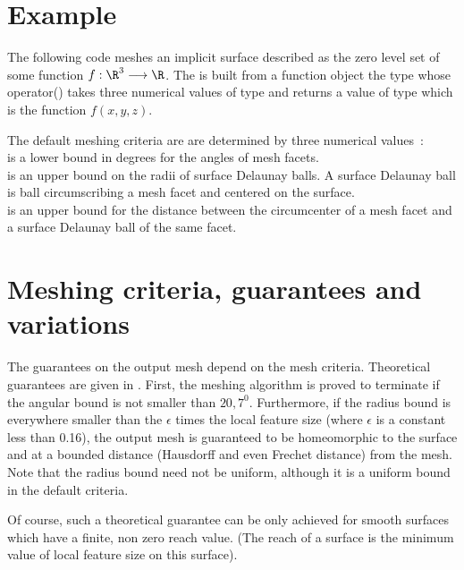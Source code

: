 \section{Example}
\label{SurfaceMesher_section_example}

The following code meshes an implicit surface described as the zero level
set of some function $f : \R^3 \longrightarrow \R$.
The   is built from 
a function object
the type  whose operator()
takes three numerical values  of type 
and returns a value of type  which is the function $f(x,y,z)$.

The default meshing criteria are  are determined  by three numerical
values~: \\ 
 is a lower bound in degrees for the angles 
     of mesh facets.\\
 is an upper bound on the radii of surface Delaunay
balls. A surface Delaunay ball is ball circumscribing a mesh facet
and centered on the surface. \\
 is an upper bound for the distance 
between the circumcenter of a mesh facet and a surface
Delaunay ball of the same facet.


\section{Meshing criteria, guarantees and variations}
\label{SurfaceMesher_section_criteria}
\label{SurfaceMesher_section_variations}

The guarantees on the output mesh depend on the mesh criteria.
Theoretical guarantees are given in \cite{Oudot-and-co}.
First, the meshing algorithm is proved to terminate 
if the angular bound is
not smaller than $20,7^0$. 
Furthermore, if the radius bound is everywhere smaller than 
the $\epsilon$ times the local feature size  (where $\epsilon$ is a constant
less than 0.16),  the output mesh 
is guaranteed to be homeomorphic to the surface
and at a bounded distance (Hausdorff and even Frechet distance)
from the mesh.
Note that the radius bound need not be uniform,
although it is a uniform bound in the default criteria.

Of course, such a theoretical guarantee can be only achieved
for smooth surfaces which have a finite, non zero
reach value. (The reach of a surface is the minimum value of local feature size on
this surface).

